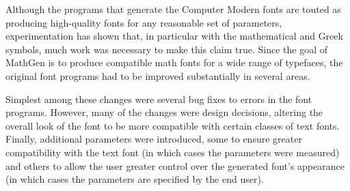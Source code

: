 
Although the programs that generate the Computer Modern fonts are touted as
producing high-quality fonts for any reasonable set of parameters,
experimentation has shown that, in particular with the mathematical and Greek
symbols, much work was necessary to make this claim true. Since the goal of
MathGen is to produce compatible math fonts for a wide range of typefaces, the
original font programs had to be improved substantially in several areas.

Simplest among these changes were several bug fixes to errors in the font
programs. However, many of the changes were design decisions, altering the
overall look of the font to be more compatible with certain classes of text
fonts. Finally, additional parameters were introduced, some to ensure greater
compatibility with the text font (in which cases the parameters were measured)
and others to allow the user greater control over the generated font's
appearance (in which cases the parameters are specified by the end user).
